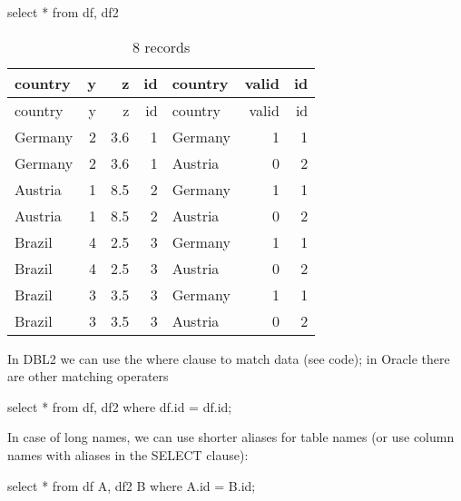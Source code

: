 \documentclass[
  letterpaper,
  DIV=11,
  numbers=noendperiod]{scrreprt}
\newenvironment{Shaded}{\begin{snugshade}}{\end{snugshade}}
\newcommand{\KeywordTok}[1]{\textcolor[rgb]{0.00,0.23,0.31}{#1}}
\newcommand{\NormalTok}[1]{\textcolor[rgb]{0.00,0.23,0.31}{#1}}
\newcommand{\OperatorTok}[1]{\textcolor[rgb]{0.37,0.37,0.37}{#1}}
\begin{document}
\begin{Shaded}
\begin{Highlighting}[]
\KeywordTok{select} \OperatorTok{*} \KeywordTok{from}\NormalTok{ df, df2}
\end{Highlighting}
\end{Shaded}

\begin{longtable}[]{@{}lrrrlrr@{}}
\caption{8 records}\tabularnewline
\toprule()
country & y & z & id & country & valid & id \\
\midrule()
\endfirsthead
\toprule()
country & y & z & id & country & valid & id \\
\midrule()
\endhead
Germany & 2 & 3.6 & 1 & Germany & 1 & 1 \\
Germany & 2 & 3.6 & 1 & Austria & 0 & 2 \\
Austria & 1 & 8.5 & 2 & Germany & 1 & 1 \\
Austria & 1 & 8.5 & 2 & Austria & 0 & 2 \\
Brazil & 4 & 2.5 & 3 & Germany & 1 & 1 \\
Brazil & 4 & 2.5 & 3 & Austria & 0 & 2 \\
Brazil & 3 & 3.5 & 3 & Germany & 1 & 1 \\
Brazil & 3 & 3.5 & 3 & Austria & 0 & 2 \\
\bottomrule()
\end{longtable}

In DBL2 we can use the where clause to match data (see code); in Oracle
there are other matching operaters

\begin{Shaded}
\begin{Highlighting}[]
\KeywordTok{select} \OperatorTok{*} \KeywordTok{from}\NormalTok{ df, df2 }\KeywordTok{where}\NormalTok{ df.}\KeywordTok{id} \OperatorTok{=}\NormalTok{ df.}\KeywordTok{id}\NormalTok{;}
\end{Highlighting}
\end{Shaded}

In case of long names, we can use shorter aliases for table names (or
use column names with aliases in the SELECT clause):

\begin{Shaded}
\begin{Highlighting}[]
\KeywordTok{select} \OperatorTok{*} \KeywordTok{from}\NormalTok{ df A, df2 B }\KeywordTok{where}\NormalTok{ A.}\KeywordTok{id} \OperatorTok{=}\NormalTok{ B.}\KeywordTok{id}\NormalTok{;}
\end{Highlighting}
\end{Shaded}
\end{document}
